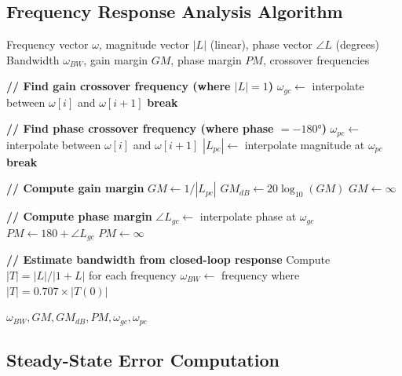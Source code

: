 \subsection{Frequency Response Analysis Algorithm}

\begin{algorithm}[htbp]
\caption{Compute Frequency-Domain Metrics from Bode Data}
\label{alg:freq_response}
\begin{algorithmic}[1]
\REQUIRE Frequency vector $\omega$, magnitude vector $|L|$ (linear), phase vector $\angle L$ (degrees)
\ENSURE Bandwidth $\omega_{BW}$, gain margin $GM$, phase margin $PM$, crossover frequencies

\STATE \textbf{// Find gain crossover frequency (where $|L| = 1$)}
        \STATE $\omega_{gc} \leftarrow$ interpolate between $\omega[i]$ and $\omega[i+1]$
        \STATE \textbf{break}
    \ENDIF
\ENDFOR

\STATE \textbf{// Find phase crossover frequency (where phase $= -180°$)}
        \STATE $\omega_{pc} \leftarrow$ interpolate between $\omega[i]$ and $\omega[i+1]$
        \STATE $|L_{pc}| \leftarrow$ interpolate magnitude at $\omega_{pc}$
        \STATE \textbf{break}
    \ENDIF
\ENDFOR

\STATE \textbf{// Compute gain margin}
    \STATE $GM \leftarrow 1 / |L_{pc}|$
    \STATE $GM_{dB} \leftarrow 20 \log_{10}(GM)$
\ELSE
    \STATE $GM \leftarrow \infty$ 
\ENDIF

\STATE \textbf{// Compute phase margin}
    \STATE $\angle L_{gc} \leftarrow$ interpolate phase at $\omega_{gc}$
    \STATE $PM \leftarrow 180 + \angle L_{gc}$
\ELSE
    \STATE $PM \leftarrow \infty$ 
\ENDIF

\STATE \textbf{// Estimate bandwidth from closed-loop response}
\STATE Compute $|T| = |L| / |1 + L|$ for each frequency
\STATE $\omega_{BW} \leftarrow$ frequency where $|T| = 0.707 \times |T(0)|$

\RETURN $\omega_{BW}, GM, GM_{dB}, PM, \omega_{gc}, \omega_{pc}$
\end{algorithmic}
\end{algorithm}

\subsection{Steady-State Error Computation}

